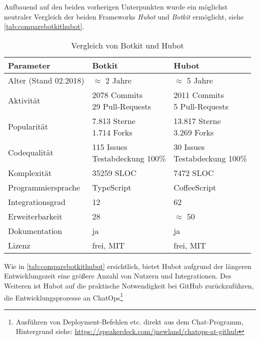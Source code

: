 Aufbauend auf den beiden vorherigen Unterpunkten wurde ein möglichst neutraler Vergleich der beiden Frameworks \textit{Hubot} und \textit{Botkit} ermöglicht, siehe \autoref{tab:comparebotkithubot}.

\begin{table}[htbp]
    \centering
    \begin{tabularx}{\textwidth}{|l|X|X|}
        \hline
        \textbf{Parameter} & \textbf{Botkit} & \textbf{Hubot} \\
        \hline
        Alter (Stand 02.2018) & $\approx$ 2 Jahre & $\approx$ 5 Jahre \\
        \hline
        Aktivität & \makecell[l]{2078 Commits\\ 29 Pull-Requests} & \makecell[l]{2011 Commits\\ 5 Pull-Requests} \\
        \hline
        Popularität & \makecell[l]{7.813 Sterne\\ 1.714 Forks} & \makecell[l]{13.817 Sterne\\ 3.269 Forks} \\
        \hline
        Codequalität & \makecell[l]{115 Issues\\ Testabdeckung 100\%} & \makecell[l]{30 Issues\\ Testabdeckung 100\%} \\
        \hline
        Komplexität & 35259 SLOC & 7472 SLOC \\
        \hline
        Programmiersprache & TypeScript & CoffeeScript \\
        \hline
        Integrationsgrad & 12 & 62 \\
        \hline
        Erweiterbarkeit & 28 & $\approx$ 50 \\
        \hline
        Dokumentation & ja & ja \\
        \hline
        Lizenz & frei, MIT & frei, MIT \\
        \hline
    \end{tabularx}
    \caption{Vergleich von Botkit und Hubot}
    \label{tab:comparebotkithubot}
\end{table}


Wie in \autoref{tab:comparebotkithubot} ersichtlich, bietet Hubot aufgrund der längeren Entwicklungszeit eine größere Anzahl von Nutzern und Integrationen. Des Weiteren ist Hubot auf die praktische Notwendigkeit bei GitHub zurückzuführen, die Entwicklungsprozesse an ChatOps\footnote{Ausführen von Deployment-Befehlen etc. direkt aus dem Chat-Programm, Hintergrund siehe: \url{https://speakerdeck.com/jnewland/chatops-at-github}}

